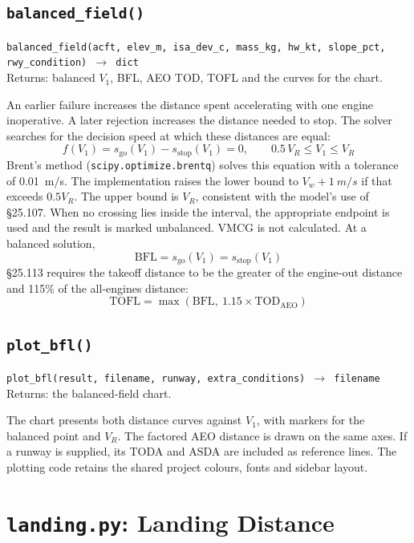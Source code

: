 \documentclass[11pt,letterpaper]{article}
\numberwithin{equation}{section}
\newcommand{\func}[2]{\begin{funcbox}\texttt{#1}\\[2pt]{\color{ink3}Returns:} #2\end{funcbox}}
\newcommand{\code}[1]{\textmd{\texttt{#1}}}
\begin{document}
\subsection{\code{balanced\_field()}}
\func{balanced\_field(acft, elev\_m, isa\_dev\_c, mass\_kg, hw\_kt, slope\_pct, rwy\_condition) $\rightarrow$ dict}{balanced $V_1$, BFL, AEO TOD, TOFL and the curves for the chart.}
An earlier failure increases the distance spent accelerating with one engine inoperative. A later rejection increases the distance needed to stop. The solver searches for the decision speed at which these distances are equal:
\begin{equation}
f(V_1) = s_\text{go}(V_1) - s_\text{stop}(V_1) = 0, \qquad 0.5\,V_R \le V_1 \le V_R \label{eq:f-v1}
\end{equation}
Brent's method (\code{scipy.optimize.brentq}) solves this equation with a tolerance of \SI{0.01}{m/s}. The implementation raises the lower bound to $V_w+\SI{1}{m/s}$ if that exceeds $0.5V_R$. The upper bound is $V_R$, consistent with the model's use of \S25.107. When no crossing lies inside the interval, the appropriate endpoint is used and the result is marked unbalanced. VMCG is not calculated. At a balanced solution,
\begin{equation}
\text{BFL} = s_\text{go}(V_1) = s_\text{stop}(V_1) \label{eq:bfl}
\end{equation}
\S25.113 requires the takeoff distance to be the greater of the engine-out distance and 115\% of the all-engines distance:
\begin{equation}
\text{TOFL} = \max\left(\text{BFL},\ 1.15\times\text{TOD}_\text{AEO}\right) \label{eq:tofl}
\end{equation}

\subsection{\code{plot\_bfl()}}
\func{plot\_bfl(result, filename, runway, extra\_conditions) $\rightarrow$ filename}{the balanced-field chart.}
The chart presents both distance curves against $V_1$, with markers for the balanced point and $V_R$. The factored AEO distance is drawn on the same axes. If a runway is supplied, its TODA and ASDA are included as reference lines. The plotting code retains the shared project colours, fonts and sidebar layout.

\section{\code{landing.py}: Landing Distance}\label{sec:landing}
\end{document}
